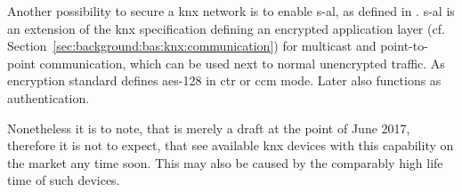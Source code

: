 Another possibility to secure a \gls{knx} network is to enable \gls{s-al}, as defined in \textcite{DIN_EN_50090-3-4}. \Gls{s-al} is an extension of the \gls{knx} specification defining an encrypted application layer (cf. Section~\ref{sec:background:bas:knx:communication}) for multicast and point-to-point communication, which can be used next to normal unencrypted traffic.
As encryption standard \textcite{DIN_EN_50090-3-4} defines \gls{aes}-128 in \gls{ctr} or \gls{ccm} mode.
Later also functions as authentication. 

Nonetheless it is to note, that \textcite{DIN_EN_50090-3-4} is merely a draft at the point of June 2017, therefore it is not to expect, that see available \gls{knx} devices with this capability on the market any time soon. This may also be caused by the comparably high life time of such devices.



